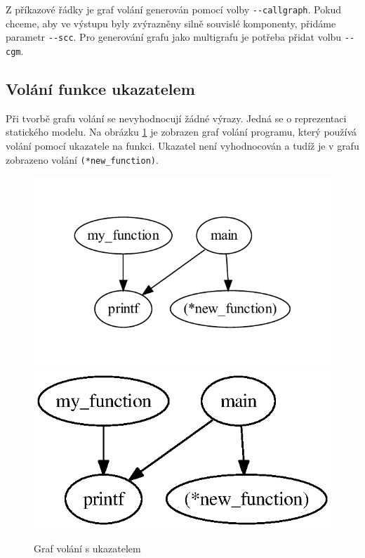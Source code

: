 \documentclass[11pt,final,oneside]{fithesis}
\begin{document}
Z příkazové řádky je graf volání generován pomocí volby \verb|--callgraph|. Pokud chceme, aby ve výstupu byly zvýrazněny silně souvislé komponenty, přidáme parametr \verb|--scc|. Pro generování grafu jako multigrafu je potřeba přidat volbu \verb|--cgm|.

\subsection{Volání funkce ukazatelem}
Při tvorbě grafu volání se nevyhodnocují žádné výrazy. Jedná se o reprezentaci statického modelu. 
Na obrázku \ref{pointer-img} je zobrazen graf volání programu, který používá volání pomocí ukazatele na funkci. Ukazatel není vyhodnocován a tudíž je v grafu zobrazeno volání  \texttt{(*new\_function)}.


\begin{figure}[h]
\begin{center}
\ifpdf
	\includegraphics[scale=0.75]{img/pointer.pdf}
\else
	\includegraphics{img/pointer.ps}
\fi
\end{center}
\caption{Graf volání s ukazatelem}
\label{pointer-img}
\end{figure}
\end{document}
